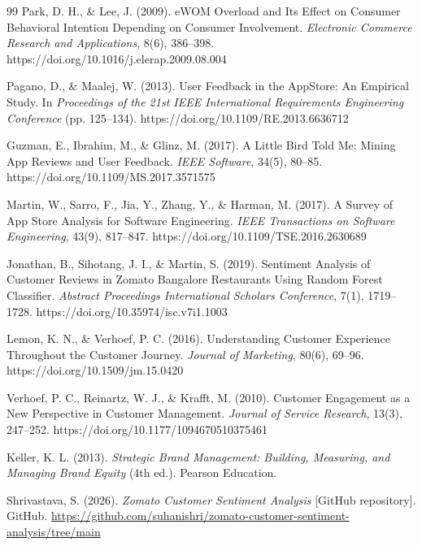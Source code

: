 \begin{thebibliography}{99}
Park, D. H., \& Lee, J. (2009).
eWOM Overload and Its Effect on Consumer Behavioral Intention Depending on Consumer Involvement.
\textit{Electronic Commerce Research and Applications},
8(6), 386--398.
https://doi.org/10.1016/j.elerap.2009.08.004

Pagano, D., \& Maalej, W. (2013).
User Feedback in the AppStore: An Empirical Study.
In \textit{Proceedings of the 21st IEEE International Requirements Engineering Conference} (pp. 125--134).
https://doi.org/10.1109/RE.2013.6636712

Guzman, E., Ibrahim, M., \& Glinz, M. (2017).
A Little Bird Told Me: Mining App Reviews and User Feedback.
\textit{IEEE Software},
34(5), 80--85.
https://doi.org/10.1109/MS.2017.3571575

Martin, W., Sarro, F., Jia, Y., Zhang, Y., \& Harman, M. (2017).
A Survey of App Store Analysis for Software Engineering.
\textit{IEEE Transactions on Software Engineering},
43(9), 817--847.
https://doi.org/10.1109/TSE.2016.2630689

Jonathan, B., Sihotang, J. I., \& Martin, S. (2019).
Sentiment Analysis of Customer Reviews in Zomato Bangalore Restaurants Using Random Forest Classifier.
\textit{Abstract Proceedings International Scholars Conference},
7(1), 1719--1728.
https://doi.org/10.35974/isc.v7i1.1003

Lemon, K. N., \& Verhoef, P. C. (2016).
Understanding Customer Experience Throughout the Customer Journey.
\textit{Journal of Marketing},
80(6), 69--96.
https://doi.org/10.1509/jm.15.0420

Verhoef, P. C., Reinartz, W. J., \& Krafft, M. (2010).
Customer Engagement as a New Perspective in Customer Management.
\textit{Journal of Service Research},
13(3), 247--252.
https://doi.org/10.1177/1094670510375461

Keller, K. L. (2013).
\textit{Strategic Brand Management: Building, Measuring, and Managing Brand Equity}
(4th ed.).
Pearson Education.

Shrivastava, S. (2026).
\textit{Zomato Customer Sentiment Analysis} [GitHub repository].
GitHub.
\url{https://github.com/suhanishri/zomato-customer-sentiment-analysis/tree/main}

\end{thebibliography}
